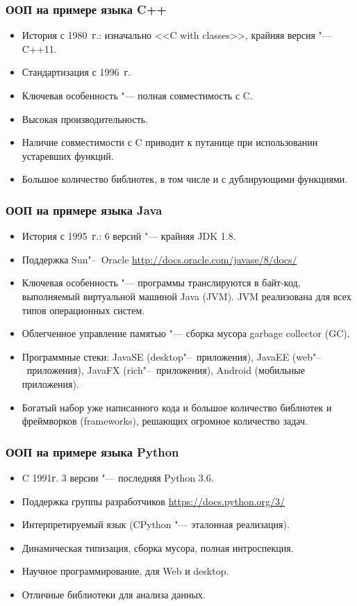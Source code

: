 \documentclass[default]{beamer}
\begin{document}
	\begin{frame}
		\frametitle{ООП на примере языка C++}
		
		\begin{itemize}
			\item История с 1980~г.: изначально <<C with classes>>, крайняя версия "---
			C++11.
			\item Стандартизация с 1996~г. 
			\item Ключевая особенность "--- полная совместимость с C.
			\item Высокая производительность.
			\item Наличие совместимости с C приводит к путанице при использовании
			устаревших функций.
			\item Большое количество библиотек, в том числе и с дублирующими функциями.
		\end{itemize}		
	
	\end{frame}
	
	\begin{frame}
		\frametitle{ООП на примере языка Java}
		
		\begin{itemize}
			\item История с 1995~г.: 6 версий "--- крайняя JDK 1.8.
			\item Поддержка Sun"--~Oracle \url{http://docs.oracle.com/javase/8/docs/}
			\item Ключевая особенность "--- программы транслируются в байт-код,
			выполняемый виртуальной машиной Java (JVM). JVM реализована для всех типов
			операционных систем.
			\item Облегченное управление памятью "--- сборка мусора garbage collector
			(GC).
			\item Программные стеки: JavaSE (desktop"--~приложения), JavaEE
			(web"--~приложения), JavaFX (rich"--~приложения), Android (мобильные
			приложения).
			\item Богатый набор уже написанного кода и большое количество библиотек и
			фреймворков (frameworks), решающих огромное количество задач.
		\end{itemize}
	\end{frame}

	\begin{frame}
		\frametitle{ООП на примере языка Python}
		
		\begin{itemize}
			\item C 1991г. 3 версии "--- последняя Python 3.6.
			\item Поддержка группы разработчиков \url{https://docs.python.org/3/}
			\item Интерпретируемый язык (CPython "--- эталонная реализация).
			\item Динамическая типизация, сборка мусора, полная интроспекция.
			\item Научное программирование, для Web и desktop.
			\item Отличные библиотеки для анализа данных.
		\end{itemize}
	\end{frame}
	
\end{document}
